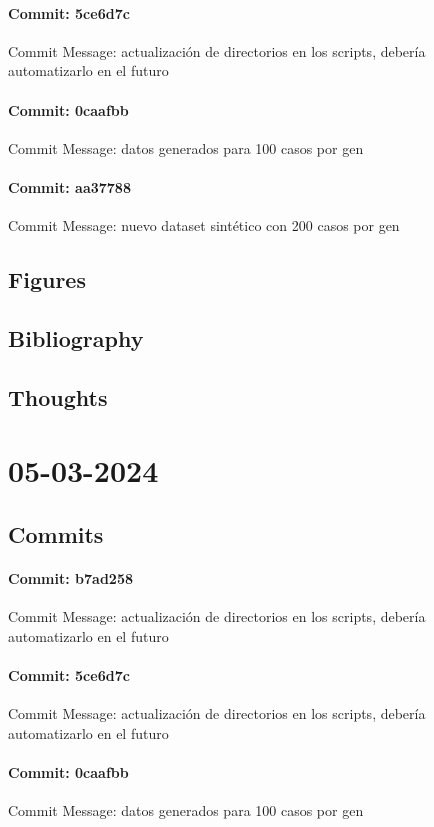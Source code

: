 \documentclass{article}
\begin{document}
\paragraph{Commit: 5ce6d7c}
Commit Message: actualización de directorios en los scripts, debería automatizarlo en el futuro

\paragraph{Commit: 0caafbb}
Commit Message: datos generados para 100 casos por gen

\paragraph{Commit: aa37788}
Commit Message: nuevo dataset sintético con 200 casos por gen

\subsection{Figures}
\subsection{Bibliography}
\subsection{Thoughts}

\section{05-03-2024}
\subsection{Commits}
\paragraph{Commit: b7ad258}
Commit Message: actualización de directorios en los scripts, debería automatizarlo en el futuro

\paragraph{Commit: 5ce6d7c}
Commit Message: actualización de directorios en los scripts, debería automatizarlo en el futuro

\paragraph{Commit: 0caafbb}
Commit Message: datos generados para 100 casos por gen
\end{document}
